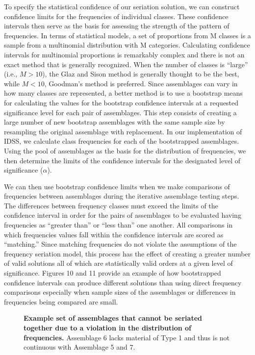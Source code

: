 \documentclass[10pt,letterpaper]{article}
\begin{document}
To specify the statistical confidence of our seriation solution, we can construct confidence limits for the frequencies of individual classes. These confidence intervals then serve as the basis for assessing the strength of the pattern of frequencies. In terms of statistical models, a set of proportions from M classes is a sample from a multinomial distribution with M categories. Calculating confidence intervals for multinomial proportions is remarkably complex and there is not an exact method that is generally recognized. When the number of classes is “large” (i.e., $M > 10$), the Glaz and Sison \cite{Glaz1999} method is generally thought to be the best, while $M < 10$, Goodman's method \cite{Goodman1965} is preferred. Since assemblages can vary in how many classes are represented, a better method is to use a bootstrap means for calculating the values for the bootstrap confidence intervals at a requested significance level for each pair of assemblages. This step consists of creating a large number of new bootstrap assemblages with the same sample size by resampling the original assemblage with replacement. In our implementation of IDSS, we calculate class frequencies for each of the bootstrapped assemblages. Using the pool of assemblages as the basis for the distribution of frequencies, we then determine the limits of the confidence intervals for the designated level of significance ($\alpha$).

We can then use bootstrap confidence limits when we make comparisons of frequencies between assemblages during the iterative assemblage testing steps. The differences between frequency classes must exceed the limits of the confidence interval in order for the pairs of assemblages to be evaluated having frequencies as “greater than” or “less than” one another. All comparisons in which frequencies values fall within the confidence intervals are scored as “matching.” Since matching frequencies do not violate the assumptions of the frequency seriation model, this process has the effect of creating a greater number of valid solutions all of which are statistically valid orders at a given level of significance. Figures 10 and 11 provide an example of how bootstrapped confidence intervals can produce different solutions than using direct frequency comparisons especially when sample sizes of the assemblages or differences in frequencies being compared are small.

\begin{figure}[h]
\caption{{\bf Example set of assemblages that cannot be seriated together due to a violation in the distribution of frequencies.} Assemblage 6 lacks material of Type 1 and thus is not continuous with Assemblage 5 and 7.  }
\label{fig10}
\end{figure}
\end{document}
